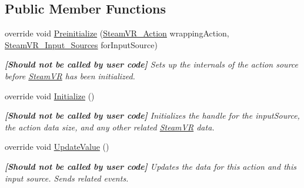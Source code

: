 \subsection*{Public Member Functions}
\begin{DoxyCompactItemize}
\item 
override void \mbox{\hyperlink{class_valve_1_1_v_r_1_1_steam_v_r___action___boolean___source_a35bf3460bf62e92bc67e371b16125c39}{Preinitialize}} (\mbox{\hyperlink{class_valve_1_1_v_r_1_1_steam_v_r___action}{Steam\+V\+R\+\_\+\+Action}} wrapping\+Action, \mbox{\hyperlink{namespace_valve_1_1_v_r_a82e5bf501cc3aa155444ee3f0662853f}{Steam\+V\+R\+\_\+\+Input\+\_\+\+Sources}} for\+Input\+Source)
\begin{DoxyCompactList}\small\item\em {\bfseries{\mbox{[}Should not be called by user code\mbox{]}}} Sets up the internals of the action source before \mbox{\hyperlink{class_valve_1_1_v_r_1_1_steam_v_r}{Steam\+VR}} has been initialized. \end{DoxyCompactList}\item 
override void \mbox{\hyperlink{class_valve_1_1_v_r_1_1_steam_v_r___action___boolean___source_abf7892da581c5adc54514e02df609b4c}{Initialize}} ()
\begin{DoxyCompactList}\small\item\em {\bfseries{\mbox{[}Should not be called by user code\mbox{]}}} Initializes the handle for the input\+Source, the action data size, and any other related \mbox{\hyperlink{class_valve_1_1_v_r_1_1_steam_v_r}{Steam\+VR}} data. \end{DoxyCompactList}\item 
override void \mbox{\hyperlink{class_valve_1_1_v_r_1_1_steam_v_r___action___boolean___source_a3a48e22c9912f24ad65e3b64a21cc54c}{Update\+Value}} ()
\begin{DoxyCompactList}\small\item\em {\bfseries{\mbox{[}Should not be called by user code\mbox{]}}} Updates the data for this action and this input source. Sends related events. \end{DoxyCompactList}\end{DoxyCompactItemize}
